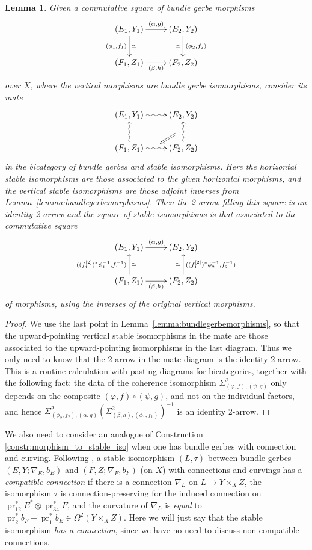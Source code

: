 \documentclass[12pt]{amsart}
\DeclareMathOperator{\pr}{pr}
\theoremstyle{plain}
\newtheorem{lemma}[theorem]{Lemma}
\theoremstyle{definition}
\theoremstyle{remark}
\numberwithin{equation}{section}
\newcommand{\<}{\langle}
\renewcommand{\>}{\rangle}
\begin{document}
\begin{lemma}\label{lemma:mate_using_isos}
Given a commutative square of bundle gerbe morphisms
\[
	\xymatrix{
		(E_1,Y_1) \ar[r]^{(\alpha,g)} \ar[d]_{(\phi_1,f_1)}^\simeq & (E_2,Y_2) \ar[d]^{(\phi_2,f_2)}_\simeq \\
		(F_1,Z_1) \ar[r]_{(\beta,h)}  & (F_2,Z_2) 
	}
\]
over $X$, where the vertical morphisms are bundle gerbe \emph{isomorphisms}, consider its mate
\[
	\xymatrix{
		(E_1,Y_1) \ar@{~>}[r]  & (E_2,Y_2) \\
		(F_1,Z_1) \ar@{~>}[r]^{\ }="t" \ar@{~>}[u] & (F_2,Z_2) \ar@{~>}[u]^{\ }="s"
		\ar@{=>}"s";"t"
	}
\]
in the bicategory of bundle gerbes and stable isomorphisms. Here the horizontal stable isomorphisms are those associated to the given horizontal morphisms, and the vertical stable isomorphisms are those adjoint inverses from Lemma~\ref{lemma:bundlegerbemorphisms}. 
Then the 2-arrow filling this square is an \emph{identity} 2-arrow and the square of stable isomorphisms is that associated to the commutative square 
\[
	\xymatrix{
		(E_1,Y_1) \ar[r]^{(\alpha,g)}  & (E_2,Y_2) \\
		(F_1,Z_1) \ar[r]_{(\beta,h)} \ar[u]_\simeq^{((f_1^{[2]})^*\phi_1^{-1},f_1^{-1})} & (F_2,Z_2) \ar[u]^\simeq_{((f_1^{[2]})^*\phi_2^{-1},f_2^{-1})}
	}
\]
of morphisms, using the inverses of the original vertical morphisms.
\end{lemma}

\begin{proof}
We use the last point in Lemma~\ref{lemma:bundlegerbemorphisms}, so that the upward-pointing vertical stable isomorphisms in the mate are those associated to the upward-pointing isomorphisms in the last diagram. Thus we only need to know that the 2-arrow in the mate diagram is the identity 2-arrow.
This is a routine calculation with pasting diagrams for bicategories, together with the following fact: the data of the coherence isomorphism $\Sigma^2_{(\varphi,f),(\psi,g)}$ only depends on the composite $(\varphi,f)\circ(\psi,g)$, and not on the individual factors, and hence $\Sigma^2_{(\phi_2,f_2),(\alpha,g)} (\Sigma^2_{(\beta,h),(\phi_1,f_1)})^{-1}$ is an identity 2-arrow.
\end{proof}

We also need to consider an analogue of Construction \ref{constr:morphism_to_stable_iso} when one has bundle gerbes with connection and curving. Following \cite[Definition 6.6]{Wal}, a stable isomorphism $(L,\tau)$ between bundle gerbes $(E,Y;\nabla_E,b_E)$ and $(F,Z;\nabla_F,b_F)$ (on $X$) with connections and curvings has a \emph{compatible connection} if there is a connection $\nabla_L$ on $L\to Y\times_X Z$, the isomorphism $\tau$ is connection-preserving for the induced connection on $\pr_{12}^*E^*\otimes\pr_{34}^*F$, and the curvature of $\nabla_L$ is \emph{equal} to $\pr_2^*b_F - \pr_1^*b_E \in \Omega^2(Y\times_X Z)$.
Here we will just say that the stable isomorphism \emph{has a connection}, since we have no need to discuss non-compatible connections.
\end{document}
